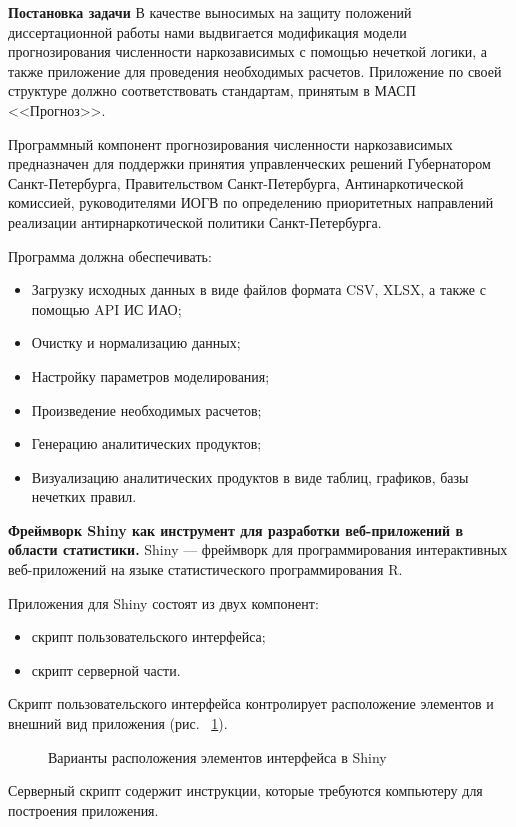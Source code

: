 \textbf{Постановка задачи}
В качестве выносимых на защиту положений диссертационной работы нами 
выдвигается модификация модели прогнозирования численности наркозависимых с
помощью нечеткой логики, а также приложение для проведения необходимых расчетов.
Приложение по своей структуре должно соответствовать стандартам, принятым в
МАСП <<Прогноз>>.

Программный компонент прогнозирования численности наркозависимых предназначен
для поддержки принятия управленческих решений Губернатором Санкт-Петербурга,
Правительством Санкт-Петербурга, Антинаркотической комиссией, руководителями
ИОГВ по определению приоритетных направлений реализации антирнаркотической
политики Санкт-Петербурга.

Программа должна обеспечивать:
\begin{itemize}
    \item Загрузку исходных данных в виде файлов формата CSV, XLSX, а также с
        помощью API ИС ИАО;
    \item Очистку и нормализацию данных;
    \item Настройку параметров моделирования;
    \item Произведение необходимых расчетов;
    \item Генерацию аналитических продуктов;
    \item Визуализацию аналитических продуктов в виде таблиц, графиков, базы
        нечетких правил.
\end{itemize}

\textbf{Фреймворк Shiny как инструмент для разработки веб-приложений в области
статистики.}
Shiny --- фреймворк для программирования интерактивных веб-приложений на языке 
статистического программирования R.

Приложения для Shiny состоят из двух компонент:
\begin{itemize}
    \item скрипт пользовательского интерфейса;
    \item скрипт серверной части.
\end{itemize}
Скрипт пользовательского интерфейса контролирует расположение элементов и
внешний вид приложения (рис. ~\ref{figure:layouts}). 

\begin{figure}[bhtp]
    \centering
    \caption{Варианты расположения элементов интерфейса в Shiny}		
    \label{figure:layouts}
\end{figure}
Серверный скрипт содержит инструкции, которые требуются компьютеру для построения 
приложения.

